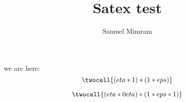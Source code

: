 \documentclass[a4paper]{article}
\title{Satex test}
\author{Samuel Mimram}
\begin{document}
\maketitle

we are here:
\[
  \twocell{(eta * 1) * (1 * eps)}
\]

\[
  \twocell{(eta *0 eta) * (1 * eps * 1)}
\]





\end{document}

